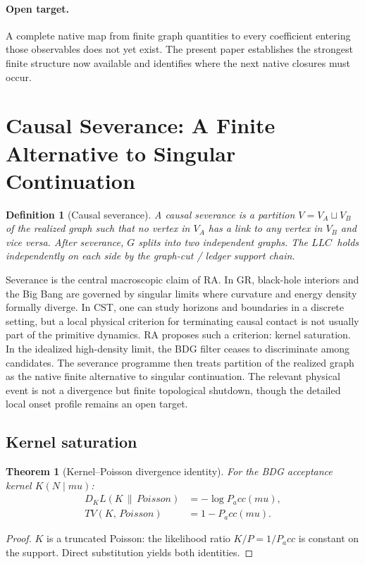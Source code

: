 \documentclass[11pt]{article}
\def\mu{mu}%
\def\mathrm#1{#1}%
\def\mathbf#1{#1}%
\def\Pacc{P_acc}%
\def\Dkl{D_KL}%
\def\TV{TV}%
\newtheorem{definition}{Definition}
\newtheorem{theorem}{Theorem}
\newcommand{\LLC}{\ensuremath{\mathrm{LLC}}}
\newcommand{\Pacc}{\ensuremath{P_{\mathrm{acc}}}}
\newcommand{\Dkl}{\ensuremath{D_{\mathrm{KL}}}}
\newcommand{\TV}{\ensuremath{\mathrm{TV}}}
\begin{document}
\paragraph{Open target.} A complete native map from finite graph quantities to every coefficient entering those observables does not yet exist. The present paper establishes the strongest finite structure now available and identifies where the next native closures must occur.

\section{Causal Severance: A Finite Alternative to Singular Continuation}
\label{sec:severance}

\begin{definition}[Causal severance]
A \emph{causal severance} is a partition $V=V_A\sqcup V_B$ of the realized graph such that no vertex in $V_A$ has a link to any vertex in $V_B$ and vice versa. After severance, $G$ splits into two independent graphs. The \LLC\ holds independently on each side by the graph-cut / ledger support chain.
\end{definition}

Severance is the central macroscopic claim of RA. In GR, black-hole interiors and the Big Bang are governed by singular limits where curvature and energy density formally diverge. In CST, one can study horizons and boundaries in a discrete setting, but a local physical criterion for terminating causal contact is not usually part of the primitive dynamics. RA proposes such a criterion: kernel saturation. In the idealized high-density limit, the BDG filter ceases to discriminate among candidates. The severance programme then treats partition of the realized graph as the native finite alternative to singular continuation. The relevant physical event is not a divergence but finite topological shutdown, though the detailed local onset profile remains an open target.

\subsection{Kernel saturation}

\begin{theorem}[Kernel--Poisson divergence identity]
\label{thm:kl}
For the BDG acceptance kernel $K(\mathbf{N}\mid \mu)$:
\begin{align}
\Dkl(K\,\|\,\mathrm{Poisson}) &= -\log\Pacc(\mu), \\
\TV(K,\,\mathrm{Poisson}) &= 1-\Pacc(\mu).
\end{align}
\end{theorem}
\begin{proof}
$K$ is a truncated Poisson: the likelihood ratio $K/P=1/\Pacc$ is constant on the support. Direct substitution yields both identities.
\end{proof}
\end{document}
